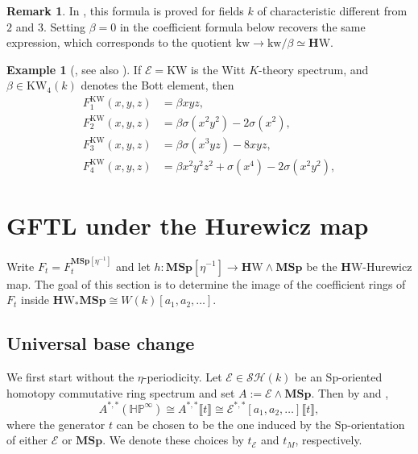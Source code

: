 \documentclass[a4paper]{amsart}
\theoremstyle{plain}
\theoremstyle{definition}
\newtheorem{example}[subsubsection]{Example}
\newtheorem{remark}[subsubsection]{Remark}
\newcommand{\Sp}{\mathrm{Sp}}
\newcommand{\MSp}{\mathbf{MSp}}
\newcommand{\etainv}{\eta^{-1}}
\newcommand{\MSpetainv}{{\MSp[\etainv]}}
\newcommand{\E}{\mathcal{E}}
\newcommand{\HP}{\mathbb{HP}}
\newcommand{\HPinf}{\HP^{\infty}}
\newcommand{\HW}{\mathbf{H}\mathrm{W}}
\newcommand{\KW}{\mathrm{KW}}
\newcommand{\kw}{\mathrm{kw}}
\newcommand{\SH}{\mathcal{SH}}
\begin{document}
\begin{remark}
	In \cite{deglise2023the}, this formula is proved for fields $k$ of characteristic different from $2$ and $3$. Setting $\beta=0$ in the coefficient formula below recovers the same expression, which corresponds to the quotient $\kw\to\kw/\beta\simeq\HW$.
\end{remark}

\begin{example}[{\cite[Lemma 1.4]{ananyevskiy2017stable}, see also \cite[Theorem 6.6]{fasel2025the}}] \label{ex:gftl-over-kw}
	If $\E = \KW$ is the Witt $K$-theory spectrum, and $\beta \in \KW_{4}(k)$ denotes the Bott element, then
	\[
		\begin{aligned}
			F_{1}^{\KW}(x,y,z) & = \beta xyz,                                        \\
			F_{2}^{\KW}(x,y,z) & = \beta \sigma(x^2y^2) - 2\sigma(x^2),              \\
			F_{3}^{\KW}(x,y,z) & = \beta \sigma(x^3yz)-8xyz,                         \\
			F_{4}^{\KW}(x,y,z) & = \beta x^2y^2z^2 + \sigma(x^4) - 2\sigma(x^2 y^2),
		\end{aligned}
	\]
\end{example}

\section{GFTL under the Hurewicz map} \label{sec:gftl-under-hurewicz}
Write $F_t=F_t^{\MSpetainv}$ and let $h:\MSpetainv \to \HW \wedge \MSp$ be the $\HW$-Hurewicz map. The goal of this section is to determine the image of the coefficient rings of $F_t$ inside $\HW_*\MSp \cong W(k)[a_1,a_2,\ldots]$.
\subsection{Universal base change}
We first start without the $\eta$-periodicity. Let $\E \in \SH(k)$ be an $\Sp$-oriented homotopy commutative ring spectrum and set $A:=\E\wedge\MSp$. Then by \cite{panin2021quaternionic} and \cite{bachmann2021eta},
\[
	A^{*,*}(\HPinf) \cong A^{*,*} \llbracket t \rrbracket \cong \E^{*,*} [ a_1, a_2, \ldots ] \llbracket t \rrbracket,
\]
where the generator $t$ can be chosen to be the one induced by the $\Sp$-orientation of either $\E$ or $\MSp$. We denote these choices by $t_{\E}$ and $t_M$, respectively.
\end{document}
